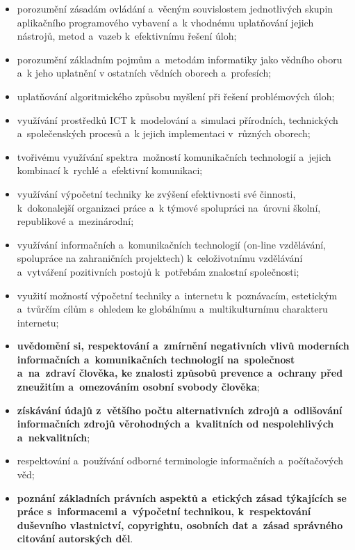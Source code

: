 \documentclass[a4paper, 12pt]{article}
\begin{document}
\begin{itemize}
    \setlength{\itemsep}{-3pt}
    \item porozumění zásadám ovládání a~věcným souvislostem jednotlivých skupin aplikačního programového
vybavení a~k vhodnému uplatňování jejich nástrojů, metod a~vazeb k~efektivnímu řešení úloh;
    \item porozumění základním pojmům a~metodám informatiky jako vědního oboru a~k jeho uplatnění
v ostatních vědních oborech a~profesích;
    \item uplatňování algoritmického způsobu myšlení při řešení problémových úloh;
    \item využívání prostředků ICT k~modelování a~simulaci přírodních, technických a~společenských procesů
a~k jejich implementaci v~různých oborech;
    \item tvořivému využívání spektra~možností komunikačních technologií a~jejich kombinací k~rychlé
a~efektivní komunikaci;
    \item využívání výpočetní techniky ke zvýšení efektivnosti své činnosti, k~dokonalejší organizaci práce
a~k týmové spolupráci na~úrovni školní, republikové a~mezinárodní;
    \item využívání informačních a~komunikačních technologií (on-line vzdělávání, spolupráce na
zahraničních projektech) k~celoživotnímu vzdělávání a~vytváření pozitivních postojů k~potřebám
znalostní společnosti;
    \item využití možností výpočetní techniky a~internetu k~poznávacím, estetickým a~tvůrčím cílům s~ohledem ke globálnímu a~multikulturnímu charakteru internetu;
    \item \textbf{uvědomění si, respektování a~zmírnění negativních vlivů moderních informačních a~komunikačních technologií na~společnost a~na~zdraví člověka, ke znalosti způsobů prevence a~ochrany před zneužitím a~omezováním osobní svobody člověka};
    \item \textbf{získávání údajů z~většího počtu alternativních zdrojů a~odlišování informačních zdrojů věrohodných a~kvalitních od nespolehlivých a~nekvalitních};
    \item respektování a~používání odborné terminologie informačních a~počítačových věd;
    \item \textbf{poznání základních právních aspektů a~etických zásad týkajících se práce s~informacemi a~výpočetní technikou, k~respektování duševního vlastnictví, copyrightu, osobních dat a~zásad správného citování autorských děl}.
\end{itemize}
\end{document}
